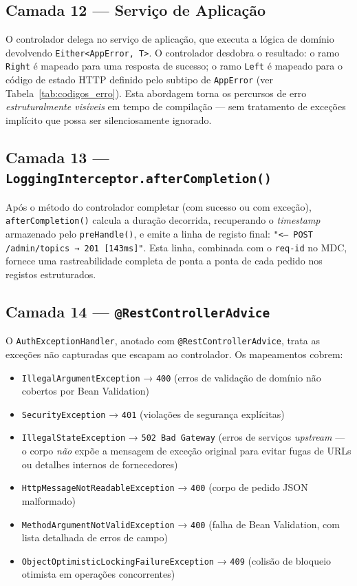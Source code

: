 \subsection*{Camada 12 — Serviço de Aplicação}

O controlador delega no serviço de aplicação, que executa a lógica de
domínio devolvendo \texttt{Either<AppError, T>}.
O controlador desdobra o resultado: o ramo \texttt{Right} é mapeado para
uma resposta de sucesso; o ramo \texttt{Left} é mapeado para o código de
estado HTTP definido pelo subtipo de \texttt{AppError}
(ver Tabela~\ref{tab:codigos_erro}).
Esta abordagem torna os percursos de erro \emph{estruturalmente visíveis}
em tempo de compilação — sem tratamento de exceções implícito que possa
ser silenciosamente ignorado.

\subsection*{Camada 13 — \texttt{LoggingInterceptor.afterCompletion()}}

Após o método do controlador completar (com sucesso ou com exceção),
\texttt{afterCompletion()} calcula a duração decorrida, recuperando o
\textit{timestamp} armazenado pelo \texttt{preHandle()}, e emite a linha
de registo final:
\texttt{"<-- POST /admin/topics → 201 [143ms]"}.
Esta linha, combinada com o \texttt{req-id} no MDC, fornece uma rastreabilidade
completa de ponta a ponta de cada pedido nos registos estruturados.

\subsection*{Camada 14 — \texttt{@RestControllerAdvice}}

O \texttt{AuthExceptionHandler}, anotado com \texttt{@RestControllerAdvice},
trata as exceções não capturadas que escapam ao controlador.
Os mapeamentos cobrem:

\begin{itemize}
  \item \texttt{IllegalArgumentException} → \texttt{400}
    (erros de validação de domínio não cobertos por Bean Validation)
  \item \texttt{SecurityException} → \texttt{401}
    (violações de segurança explícitas)
  \item \texttt{IllegalStateException} → \texttt{502 Bad Gateway}
    (erros de serviços \textit{upstream} — o corpo \emph{não} expõe a
    mensagem de exceção original para evitar fugas de URLs ou detalhes
    internos de fornecedores)
  \item \texttt{HttpMessageNotReadableException} → \texttt{400}
    (corpo de pedido JSON malformado)
  \item \texttt{MethodArgumentNotValidException} → \texttt{400}
    (falha de Bean Validation, com lista detalhada de erros de campo)
  \item \texttt{ObjectOptimisticLockingFailureException} → \texttt{409}
    (colisão de bloqueio otimista em operações concorrentes)
\end{itemize}

